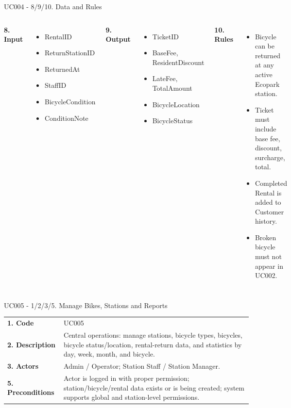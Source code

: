 \documentclass[aspectratio=169,10pt]{beamer}
\newcommand{\tightitems}{\setlength{\itemsep}{2pt}\setlength{\parskip}{0pt}}
\begin{document}
\begin{frame}{UC004 - 8/9/10. Data and Rules}
\footnotesize
\begin{columns}[T,onlytextwidth]
\textbf{8. Input}
\begin{itemize}\tightitems
  \item RentalID
  \item ReturnStationID
  \item ReturnedAt
  \item StaffID
  \item BicycleCondition
  \item ConditionNote
\end{itemize}
\textbf{9. Output}
\begin{itemize}\tightitems
  \item TicketID
  \item BaseFee, ResidentDiscount
  \item LateFee, TotalAmount
  \item BicycleLocation
  \item BicycleStatus
\end{itemize}
\textbf{10. Rules}
\begin{itemize}\tightitems
  \item Bicycle can be returned at any active Ecopark station.
  \item Ticket must include base fee, discount, surcharge, total.
  \item Completed Rental is added to Customer history.
  \item Broken bicycle must not appear in UC002.
\end{itemize}
\end{columns}
\end{frame}

\begin{frame}{UC005 - 1/2/3/5. Manage Bikes, Stations and Reports}
\small
\begin{tabular}{p{}p{}}
\toprule
\textbf{1. Code} & UC005 \\
\textbf{2. Description} & Central operations: manage stations, bicycle types, bicycles, bicycle status/location, rental-return data, and statistics by day, week, month, and bicycle. \\
\textbf{3. Actors} & Admin / Operator; Station Staff / Station Manager. \\
\textbf{5. Preconditions} & Actor is logged in with proper permission; station/bicycle/rental data exists or is being created; system supports global and station-level permissions. \\
\bottomrule
\end{tabular}
\end{frame}
\end{document}
